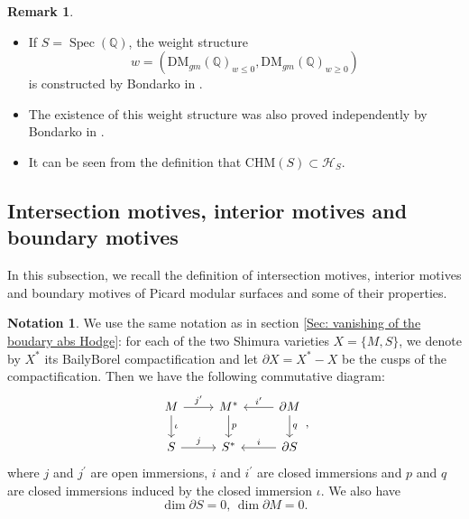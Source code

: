 \documentclass[11pt, a4paper]{amsart}
\theoremstyle{plain}
\theoremstyle{definition}
\newtheorem{remark}[theorem]{Remark}
\newtheorem{notation}[theorem]{Notation}
\numberwithin{equation}{section}
\def\QQ{\mathbb{Q}}
\DeclareMathOperator{\Spec}{Spec}
\begin{document}
\begin{remark}
    \begin{itemize}
        \item If $S = \Spec(\QQ)$, the weight structure 
        \begin{equation*}
            w = (\mathrm{DM}_{gm}(\QQ)_{w \le 0}, \mathrm{DM}_{gm}(\QQ)_{w \ge 0}) 
        \end{equation*}
        is constructed by Bondarko in \cite[Proposition 6.5.3]{Bondarko10}. 
        \item The existence of this weight structure was also proved independently by Bondarko in \cite{Bondarko17}. 
        \item It can be seen from the definition that $\mathrm{CHM}(S) \subset \mathcal{H}_{S}$. 
    \end{itemize}
\end{remark}

\subsection{Intersection motives, interior motives and boundary motives}
\label{Sec: interior and boundary motive}
In this subsection, we recall the definition of intersection motives, interior motives and boundary motives of Picard modular surfaces and some of their properties. 

\begin{notation}
    We use the same notation as in section \ref{Sec: vanishing of the boudary abs Hodge}:
    for each of the two Shimura varieties $X = \{M, S\}$, we denote by $X^{*}$ its Baily{\textendash}Borel compactification and let $\partial{X} = X^{*} - X$ be the cusps of the compactification. Then we have the following commutative diagram: 
    \begin{equation}
    \label{eq: diagram of compactification}
            \begin{tikzcd}
                M \ar[r, "j^{\prime}"] \ar[d, "{\iota}"] & M^{*} \ar[d, "p"] & \partial{M} \ar[l, "i^{\prime}" above] \ar[d, "q"] \\
                S \ar[r, "j"] & S^{*} & \partial{S} \ar[l, "i" above]  
            \end{tikzcd},
    \end{equation}
    where $j$ and $j^{\prime}$ are open immersions, $i$ and $i^{\prime}$ are closed immersions and $p$ and $q$ are closed immersions induced by the closed immersion $\iota$. We also have 
    \begin{equation*}
        \dim \partial S = 0, \, \dim \partial M = 0. 
    \end{equation*}
\end{notation}
\end{document}
